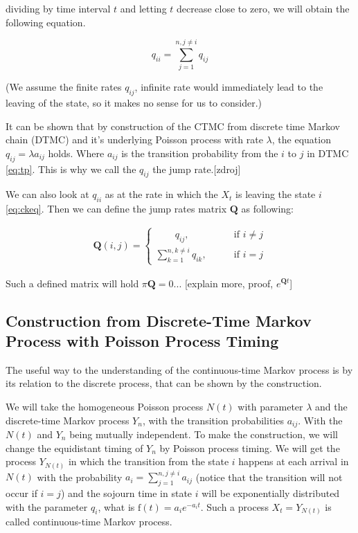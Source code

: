 \documentclass[thesis=M,english]{FITthesis}[2012/10/20]
\newcommand{\matr}[1]{\mathbf{#1}}
\begin{document}
dividing by time interval $t$ and letting $t$ decrease close to zero, we will obtain the following equation. 

\begin{equation}\label{eq:qii}
 q_{ii} =  \sum_{j = 1}^{ n ,j \neq i} q_{ij} 
\end{equation}

(We assume the finite rates $q_{ij}$, infinite rate would immediately lead to the leaving of the state, so it makes no sense for us to consider.)

It can be shown that by construction of the CTMC from discrete time Markov chain (DTMC) and  it's underlying Poisson process with rate $\lambda$, the equation $q_{ij} = \lambda a_{ij}$ holds. Where $a_{ij}$ is the transition probability from the $i$ to $j$ in DTMC \ref{eq:tp}. This is why we call the $q_{ij}$ the jump rate.[zdroj]  


We can also look at $q_{ii}$ as at the rate in which the $X_t$ is leaving the state $i$ \eqref{eq:ckeq}. Then we can define the jump rates matrix $\matr{Q}$ as following:

\begin{equation}
\begin{aligned}  
\matr{Q}(i,j)= 
\begin{cases}
\qquad q_{ij}, \qquad & \text{if } i\neq j\\
\sum\limits_{k = 1}^{ n ,k \neq i} q_{ik}, \qquad & \text{if } i=j
\end{cases}
\end{aligned}
\end{equation}

Such a defined matrix will hold $\pi\matr{Q} = 0$... [explain more, proof, $e^{\matr{Q}t}$]

\subsection{Construction from Discrete-Time Markov Process with Poisson Process Timing } 

The useful way to the understanding of the continuous-time Markov process is by its relation to the discrete process, that can be shown by the construction.

We will take the homogeneous Poisson process $N(t)$ with parameter $\lambda$ and the discrete-time Markov process $Y_n$, with the transition probabilities $a_{ij}$. With the $N(t)$ and $Y_n$ being mutually independent. To make the construction, we will change the equidistant timing of $Y_n$ by Poisson process timing. We will get the process $Y_{N(t)}$ in which the transition from the state $i$ happens at each arrival in $N(t)$ with the probability $a_i = \sum_{j = 1}^{ n ,j \neq i} a_{ij}$ (notice that the transition will not occur if $i=j$) and the sojourn time in state $i$ will be exponentially distributed with the parameter $q_i$, what is $\mathrm{f}(t)= a_i e^{-a_i t}$. Such a process $X_t = Y_{N(t)}$ is called continuous-time Markov process.
\end{document}
